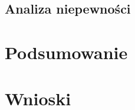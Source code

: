 \documentclass[a4paper,12pts]{article}
\begin{document}
	
	\subsection{Analiza niepewności}
	

	\section{Podsumowanie}


	\section{Wnioski}
	
\end{document}
